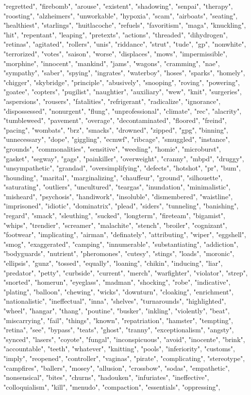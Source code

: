 "regretted", "firebomb", "arouse", "existent", "shadowing", "senpai", "therapy", "roosting", "alzheimers", "unworkable", "hypoxia", "scam", "airboats", "seating", "healthiest", "starlings", "huitlacoche", "refuels", "favoritism", "maga", "knuckling", "hit", "repentant", "leaping", "pretexts", "actions", "threaded", "dihydrogen", "retinas", "agitated", "rollers", "unis", "riddance", "strut", "tude", "gp", "nonwhite", "terrorized", "votes", "saison", "worse", "displaces", "mows", "impermissible", "morphine", "innocent", "mankind", "jams", "wagons", "cramming", "nae", "sympathy", "saber", "spying", "ingrates", "waterboy", "hoses", "sparks", "homely", "chigger", "skybridge", "principle", "abusively", "snooping", "roving", "powering", "goatee", "copters", "pugilist", "naughtier", "auxiliary", "wew", "knit", "surgeries", "aspersions", "rousers", "fatalities", "refrigerant", "radicalize", "ignorance", "dispossessed", "nonurgent", "flung", "unprofessional", "climate", "rec", "alacrity", "tumbleweed", "pavement", "overage", "decontaminated", "floored", "freind", "pacing", "wombats", "brz", "smacks", "drowned", "zipped", "gpg", "binning", "unnecessary", "dope", "giggling", "ecmwf", "ribcage", "smuggled", "instance", "grounds", "commonalities", "sensitive", "weeding", "homie", "microburst", "gasket", "segway", "gags", "painkiller", "overweight", "cranny", "mbpd", "druggy", "unsympathetic", "grandad", "oversimplifying", "defects", "hotshot", "pr", "bum", "hounding", "marital", "marginalizing", "chauffeur", "ground", "silhouette", "saturating", "outliers", "uncultured", "teargas", "inundation", "minimalistic", "misheard", "psychosis", "handiwork", "insoluble", "dismembered", "waistline", "imprisoned", "idiotic", "dominatrix", "plead", "siders", "tunneling", "banishing", "regard", "smack", "sleuthing", "sucked", "longterm", "fireteam", "bigamist", "whips", "trendier", "screamer", "malachite", "stench", "broiler", "cognizant", "footwear", "implicating", "airman", "definately", "attributing", "wiper", "eggshell", "smog", "exaggerated", "camping", "innumerable", "substantiating", "addiction", "bodyguards", "nutrient", "pheromones", "cutesy", "stings", "loads", "moronic", "ellipsis", "gunz", "tossed", "equally", "loaning", "chikin", "inducing", "liar", "predator", "petty", "curbside", "current", "merch", "warfighter", "violator", "strep", "snorted", "homerun", "eyeglass", "madman", "shocking", "robe", "indicative", "plating", "balloon", "chewing", "wicks", "downturn", "cloaking", "enrichment", "nationalistic", "ineffectual", "inna", "shelves", "turnarounds", "highlighted", "wheel", "hangar", "thang", "poutine", "busker", "inkling", "violently", "beat", "miscarrying", "fail", "things", "known", "repatriation", "hamster", "tempting", "retina", "see", "bypass", "teats", "ghost", "tranny", "exceptionalism", "angsty", "synced", "lasers", "coyote", "fungal", "inconspicuous", "avoid", "inocente", "brink", "accountable", "teeth", "whatever", "knitting", "pools", "inferiority", "customs", "imply", "reopened", "controller", "vaginas", "pirate", "complicating", "stereotype", "campfires", "ballers", "mosey", "allusion", "crossbow", "sodas", "empathetic", "nonsensical", "bites", "churns", "hadouken", "infuriates", "ineffective", "colloquialism", "kill", "menudo", "compaction", "essentials", "oppressing", 